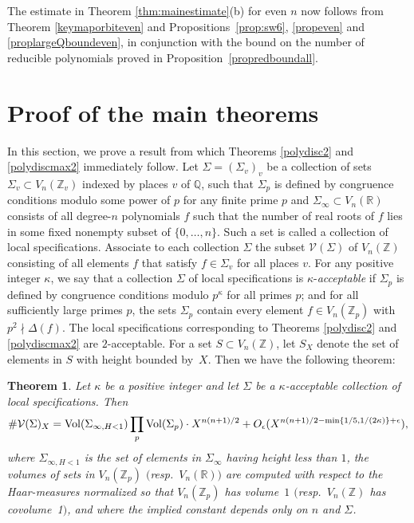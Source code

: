 \documentclass[11pt]{article}
\def\Z{{\mathbb Z}}
\def\Vol{{\rm Vol}}
\def\R{{\mathbb R}}
\def\Q{{\mathbb Q}}
\def\V{{\mathcal V}}
\def\Vmn{{V_n}}
\def\Z{{\mathbb Z}}
\def\Q{{\mathbb Q}}
\newtheorem{theorem}{Theorem}[section]
\begin{document}
The estimate in Theorem \ref{thm:mainestimate}(b) for even $n$ now
follows from Theorem \ref{keymaporbiteven} and Propositions~\ref{prop:sw6},
\ref{propeven} and \ref{proplargeQboundeven}, in conjunction with the
bound on the number of reducible polynomials proved in
Proposition~\ref{propredboundall}.





\section{Proof of the main theorems}\label{sec:sieve}

In this section, we prove a result from which Theorems \ref{polydisc2}
and \ref{polydiscmax2} immediately follow. Let $\Sigma=(\Sigma_v)_v$
be a collection of sets $\Sigma_v\subset \Vmn(\Z_v)$ indexed by places
$v$ of $\Q$, such that $\Sigma_p$ is defined by congruence conditions
modulo some power of $p$ for any finite prime $p$ and $\Sigma_\infty\subset\Vmn(\R)$ consists
of all degree-$n$ polynomials $f$ such that the number of real roots
of $f$ lies in some fixed nonempty subset of
$\{0,\ldots,n\}$. Such a set is called a collection of local specifications. Associate to each collection $\Sigma$ the subset
$\V(\Sigma)$ of $\Vmn(\Z)$ consisting of all elements $f$ that satisfy
$f\in\Sigma_v$ for all places $v$.  For any positive integer $\kappa$, we say that a collection
$\Sigma$ of local specifications is $\kappa$-{\it acceptable} if $\Sigma_p$ is defined by congruence conditions modulo $p^\kappa$ for all primes $p$; and for all
sufficiently large primes $p$, the sets $\Sigma_p$ contain every
element $f\in\Vmn(\Z_p)$ with $p^2\nmid\Delta(f)$. The local specifications corresponding to Theorems \ref{polydisc2}
and \ref{polydiscmax2} are $2$-acceptable. For a set $S\subset \Vmn(\Z)$, let $S_X$
denote the set of elements in $S$ with height bounded by~$X$. Then we have the
following theorem:

\begin{theorem}\label{thmaingencong}
Let $\kappa$ be a positive integer and let $\Sigma$ be a $\kappa$-acceptable collection of local specifications. Then
\begin{equation*}
\#\V(\Sigma)_X=\Vol(\Sigma_{\infty,H<1})\prod_p\Vol(\Sigma_p)\cdot
X^{n(n+1)/2}+O_\epsilon(X^{n(n+1)/2-\min\{1/5,1/(2\kappa)\}+\epsilon}),
\end{equation*}
where $\Sigma_{\infty,H<1}$ is the set of elements in $\Sigma_\infty$
having height less than $1$, the volumes of sets in $\Vmn(\Z_p)$
$($resp.\ $\Vmn(\R))$ are computed with respect to the Haar-measures
normalized so that $\Vmn(\Z_p)$ has volume~$1$ $($resp.\ $\Vmn(\Z)$ has
covolume~1$)$, and where the implied constant depends only on $n$ and $\Sigma$.
\end{theorem}
\end{document}
